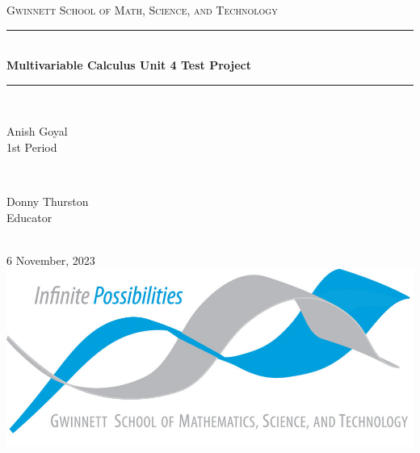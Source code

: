 \begin{titlepage}

    \newcommand{\HRule}{\rule{\linewidth}{0.5mm}}
    
    \center
    
    \vspace{10cm}

    \textsc{\LARGE Gwinnett School of Math, Science, and Technology }\\[0.3cm]
    
    \vspace{0.5cm}

    \HRule \\[0.4cm]
    { \huge \bfseries Multivariable Calculus Unit 4 Test Project}\\[0.03cm]
    \HRule \\[1.5cm]
    
    \begin{minipage}{0.4\textwidth}
    \begin{flushleft} \Large
    Anish Goyal \\1st Period
    \end{flushleft}
    \end{minipage}
    ~
    \begin{minipage}{0.4\textwidth}
    \begin{flushright} \Large
    Donny Thurston\\Educator
    \end{flushright}
    \end{minipage}\\[1cm]
    
    {\Large 6 November, 2023}\\[1cm]
    
    \includegraphics{img/logo.jpeg}\\
    \vfill
\end{titlepage}